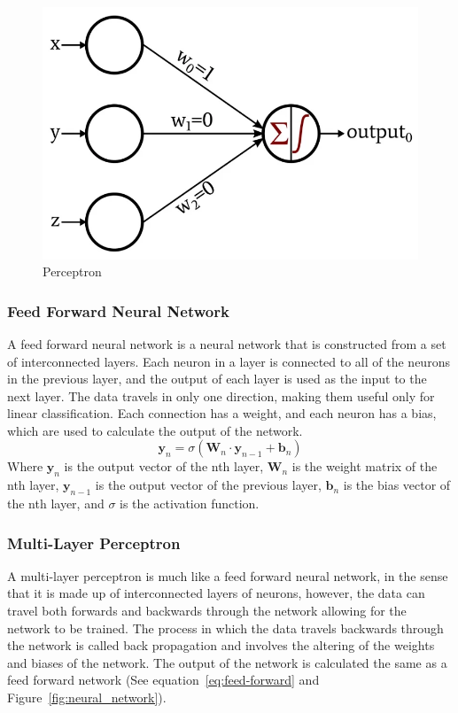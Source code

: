 \documentclass[titlepage]{article}
\begin{document}
\begin{figure}[h!]
    \includegraphics[width=\textwidth]{./assets/perceptron.png}
    \caption{Perceptron}
    \label{fig:perceptron}
\end{figure}

\subsubsection{Feed Forward Neural Network}
A feed forward neural network is a neural network that is constructed from a set of interconnected layers. Each neuron in a layer is connected to all of the neurons in the previous layer, and the output of each layer is used as the input to the next layer. The data travels in only one direction, making them useful only for linear classification. Each connection has a weight, and each neuron has a bias, which are used to calculate the output of the network.
\begin{equation}
    \textbf{y}_n=\sigma{(\textbf{W}_n\cdot\textbf{y}_{n-1} + \textbf{b}_n)}
    \label{eq:feed-forward}
\end{equation}
Where $\textbf{y}_n$ is the output vector of the nth layer, $\textbf{W}_n$ is the weight matrix of the nth layer, $\textbf{y}_{n-1}$ is the output vector of the previous layer, $\textbf{b}_n$ is the bias vector of the nth layer, and $\sigma$ is the activation function.

\subsubsection{Multi-Layer Perceptron}
A multi-layer perceptron is much like a feed forward neural network, in the sense that it is made up of interconnected layers of neurons, however, the data can travel both forwards and backwards through the network allowing for the network to be trained. The process in which the data travels backwards through the network is called back propagation and involves the altering of the weights and biases of the network. The output of the network is calculated the same as a feed forward network (See equation~\ref{eq:feed-forward} and Figure~\ref{fig:neural_network}).
\end{document}
